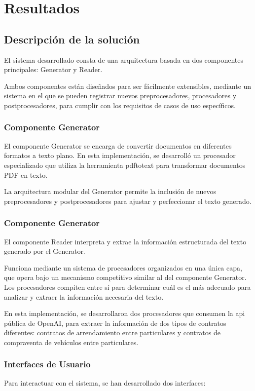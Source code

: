 \chapter{Resultados}\label{ch:chapter_4}


\section{Descripción de la solución}
El sistema desarrollado consta de una arquitectura basada en dos componentes principales: Generator y Reader.

Ambos componentes están diseñados para ser fácilmente extensibles, mediante un sistema en el que se pueden registrar
nuevos preprocesadores, procesadores y postprocesadores, para cumplir con los requisitos de casos de uso específicos.

\subsection{Componente Generator}
El componente Generator se encarga de convertir documentos en diferentes formatos a texto plano.
En esta implementación, se desarrolló un procesador especializado que utiliza la herramienta pdftotext para transformar
documentos PDF en texto.

La arquitectura modular del Generator permite la inclusión de nuevos preprocesadores y postprocesadores para ajustar y
perfeccionar el texto generado.

\subsection{Componente Generator}
El componente Reader interpreta y extrae la información estructurada del texto generado por el Generator.

Funciona mediante un sistema de procesadores organizados en una única capa, que opera bajo un mecanismo competitivo
similar al del componente Generator.
Los procesadores compiten entre sí para determinar cuál es el más adecuado para analizar y extraer la información
necesaria del texto.

En esta implementación, se desarrollaron dos procesadores que consumen la api pública de OpenAI, para extraer la
información de dos tipos de contratos diferentes: contratos de arrendamiento entre particulares y contratos de
compraventa de vehículos entre particulares.

\subsection{Interfaces de Usuario}
Para interactuar con el sistema, se han desarrollado dos interfaces:

